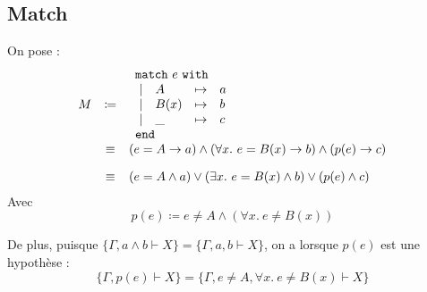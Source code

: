 \documentclass[12pt]{article}
\newcommand{\omatch}{\texttt{match}~}
\newcommand{\owith}{~\texttt{with}}
\newcommand{\oend}{\texttt{end}}
\begin{document}
\subsection*{Match}
On pose :
\[
  \begin{array}{rcl}
    M & \coloneqq &
    \begin{array}{clcl}
      \multicolumn{4}{l}{\omatch e \owith} \\
      ~| & A    & \mapsto & a              \\
      ~| & B(x) & \mapsto & b              \\
      ~| & \_   & \mapsto & c              \\
      \multicolumn{4}{l}{\oend}
    \end{array}                                                                           \\
      & \equiv    & (e = A \rightarrow a ) \land (\forall x.~ e = B(x) \rightarrow b ) \land (p(e) \rightarrow c ) \\[10pt]
      & \equiv    & (e = A \land a ) \lor (\exists x.~ e = B(x) \land b ) \lor (p(e) \land c )                     \\
  \end{array}
\]
Avec
\[
  p(e) \coloneqq e \neq A \land (\forall x.~ e \neq B(x))
\]

\bigskip


De plus, puisque $\{\Gamma, a \land b \vdash X \} = \{\Gamma, a, b \vdash X \}
$, on a lorsque $p(e)$ est une hypothèse :
\[
  \{\Gamma, p(e) \vdash X \} = \{\Gamma, e \neq A, \forall x.~ e \neq B(x) \vdash X \}
\]
\end{document}
